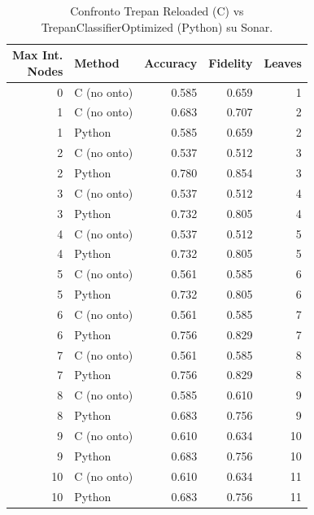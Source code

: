 \begin{table}[ht]
\centering
\footnotesize
\begin{tabular}{r l r r r}
\toprule
\makecell{Max Int.\\Nodes} & Method & Accuracy & Fidelity & Leaves \\
\midrule
0 & C (no onto)  & 0.585 & 0.659 & 1 \\
\midrule
1 & C (no onto)  & 0.683 & 0.707 & 2 \\
1 & Python       & 0.585 & 0.659 & 2 \\
\midrule
2 & C (no onto)  & 0.537 & 0.512 & 3 \\
2 & Python       & 0.780 & 0.854 & 3 \\
\midrule
3 & C (no onto)  & 0.537 & 0.512 & 4 \\
3 & Python       & 0.732 & 0.805 & 4 \\
\midrule
4 & C (no onto)  & 0.537 & 0.512 & 5 \\
4 & Python       & 0.732 & 0.805 & 5 \\
\midrule
5 & C (no onto)  & 0.561 & 0.585 & 6 \\
5 & Python       & 0.732 & 0.805 & 6 \\
\midrule
6 & C (no onto)  & 0.561 & 0.585 & 7 \\
6 & Python       & 0.756 & 0.829 & 7 \\
\midrule
7 & C (no onto)  & 0.561 & 0.585 & 8 \\
7 & Python       & 0.756 & 0.829 & 8 \\
\midrule
8 & C (no onto)  & 0.585 & 0.610 & 9 \\
8 & Python       & 0.683 & 0.756 & 9 \\
\midrule
9 & C (no onto)  & 0.610 & 0.634 & 10 \\
9 & Python       & 0.683 & 0.756 & 10 \\
\midrule
10 & C (no onto)  & 0.610 & 0.634 & 11 \\
10 & Python       & 0.683 & 0.756 & 11 \\
\bottomrule
\end{tabular}
\caption{Confronto Trepan Reloaded (C) vs TrepanClassifierOptimized (Python) su Sonar.}
\label{tab:c_vs_python}
\end{table}